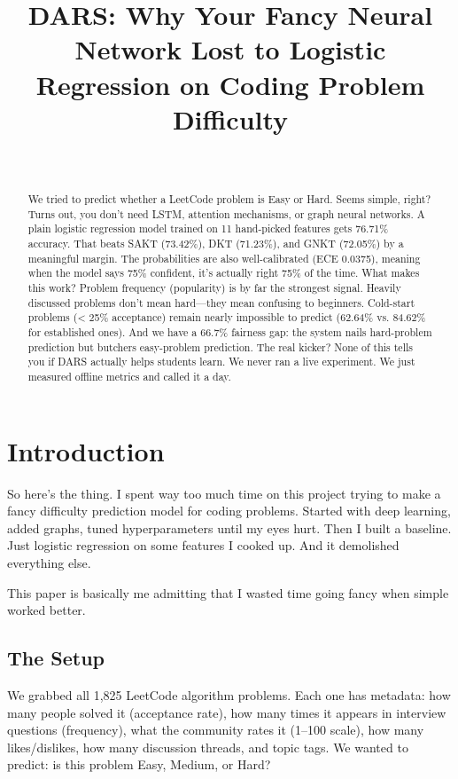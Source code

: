 \documentclass[conference]{IEEEtran}
\title{DARS: Why Your Fancy Neural Network Lost to Logistic Regression on Coding Problem Difficulty}
\author{\IEEEauthorblockN{Khethavath Sunil Naik}\\
\IEEEauthorblockA{BTech Project}}
\begin{document}
\maketitle

\begin{abstract}
We tried to predict whether a LeetCode problem is Easy or Hard. Seems simple, right? Turns out, you don't need LSTM, attention mechanisms, or graph neural networks. A plain logistic regression model trained on 11 hand-picked features gets 76.71\% accuracy. That beats SAKT (73.42\%), DKT (71.23\%), and GNKT (72.05\%) by a meaningful margin. The probabilities are also well-calibrated (ECE 0.0375), meaning when the model says 75\% confident, it's actually right 75\% of the time. What makes this work? Problem frequency (popularity) is by far the strongest signal. Heavily discussed problems don't mean hard—they mean confusing to beginners. Cold-start problems (< 25\% acceptance) remain nearly impossible to predict (62.64\% vs. 84.62\% for established ones). And we have a 66.7\% fairness gap: the system nails hard-problem prediction but butchers easy-problem prediction. The real kicker? None of this tells you if DARS actually helps students learn. We never ran a live experiment. We just measured offline metrics and called it a day.
\end{abstract}

\section{Introduction}

So here's the thing. I spent way too much time on this project trying to make a fancy difficulty prediction model for coding problems. Started with deep learning, added graphs, tuned hyperparameters until my eyes hurt. Then I built a baseline. Just logistic regression on some features I cooked up. And it demolished everything else.

This paper is basically me admitting that I wasted time going fancy when simple worked better.

\subsection{The Setup}

We grabbed all 1,825 LeetCode algorithm problems. Each one has metadata: how many people solved it (acceptance rate), how many times it appears in interview questions (frequency), what the community rates it (1--100 scale), how many likes/dislikes, how many discussion threads, and topic tags. We wanted to predict: is this problem Easy, Medium, or Hard?
\end{document}
